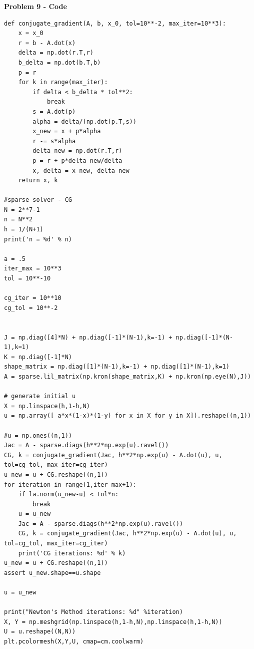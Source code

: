 \documentclass[12pt]{article}
\newcommand{\problem}[1]{\hspace{-4 ex} \large \textbf{Problem #1} }
\begin{document}
\problem{9 - Code}
\begin{lstlisting}
def conjugate_gradient(A, b, x_0, tol=10**-2, max_iter=10**3):
	x = x_0
	r = b - A.dot(x)
	delta = np.dot(r.T,r)
	b_delta = np.dot(b.T,b)
	p = r
	for k in range(max_iter):
		if delta < b_delta * tol**2:
			break
		s = A.dot(p)
		alpha = delta/(np.dot(p.T,s))
		x_new = x + p*alpha
		r -= s*alpha
		delta_new = np.dot(r.T,r)
		p = r + p*delta_new/delta
		x, delta = x_new, delta_new
	return x, k

#sparse solver - CG
N = 2**7-1
n = N**2
h = 1/(N+1)
print('n = %d' % n)

a = .5
iter_max = 10**3
tol = 10**-10

cg_iter = 10**10
cg_tol = 10**-2


J = np.diag([4]*N) + np.diag([-1]*(N-1),k=-1) + np.diag([-1]*(N-1),k=1)
K = np.diag([-1]*N)
shape_matrix = np.diag([1]*(N-1),k=-1) + np.diag([1]*(N-1),k=1)
A = sparse.lil_matrix(np.kron(shape_matrix,K) + np.kron(np.eye(N),J))

# generate initial u
X = np.linspace(h,1-h,N)
u = np.array([ a*x*(1-x)*(1-y) for x in X for y in X]).reshape((n,1))

#u = np.ones((n,1))
Jac = A - sparse.diags(h**2*np.exp(u).ravel())
CG, k = conjugate_gradient(Jac, h**2*np.exp(u) - A.dot(u), u, tol=cg_tol, max_iter=cg_iter)
u_new = u + CG.reshape((n,1))
for iteration in range(1,iter_max+1):
	if la.norm(u_new-u) < tol*n:
		break
	u = u_new
	Jac = A - sparse.diags(h**2*np.exp(u).ravel())
	CG, k = conjugate_gradient(Jac, h**2*np.exp(u) - A.dot(u), u, tol=cg_tol, max_iter=cg_iter)
	print('CG iterations: %d' % k)
u_new = u + CG.reshape((n,1))
assert u_new.shape==u.shape

u = u_new

print("Newton's Method iterations: %d" %iteration)
X, Y = np.meshgrid(np.linspace(h,1-h,N),np.linspace(h,1-h,N))
U = u.reshape((N,N))
plt.pcolormesh(X,Y,U, cmap=cm.coolwarm)
\end{lstlisting}
\end{document}
